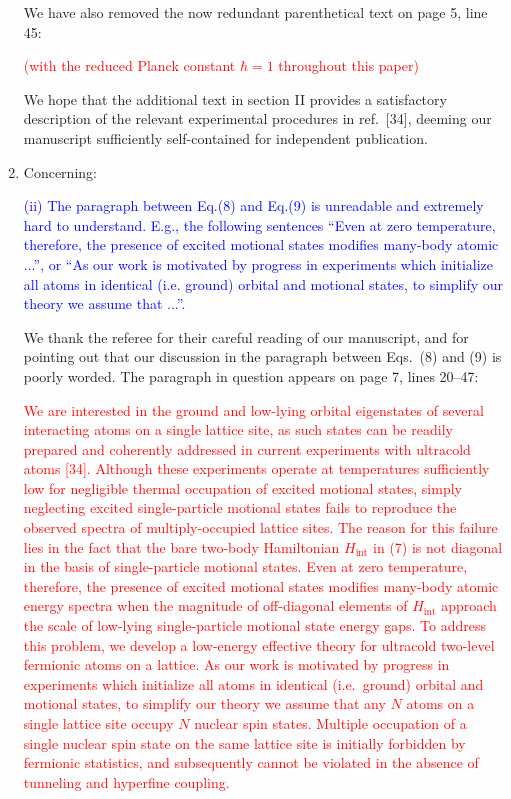 \documentclass[preprint]{revtex4-1}
\renewcommand{\t}{\text} %
\newcommand{\1}{\mathds{1}}
\newcommand{\blue}[1]{\textcolor{blue}{#1}}
\newcommand{\red}[1]{\textcolor{red}{#1}}
\begin{document}
\begin{enumerate}
  We have also removed the now redundant parenthetical text on page 5,
  line 45:

  \red{(with the reduced Planck constant $\hbar=1$ throughout this
    paper)}

  We hope that the additional text in section II provides a
  satisfactory description of the relevant experimental procedures in
  ref.~[34], deeming our manuscript sufficiently self-contained for
  independent publication.


\item Concerning:

  \blue{(ii) The paragraph between Eq.(8) and Eq.(9) is unreadable and
    extremely hard to understand. E.g., the following sentences ``Even
    at zero temperature, therefore, the presence of excited motional
    states modifies many-body atomic ...'', or ``As our work is
    motivated by progress in experiments which initialize all atoms in
    identical (i.e. ground) orbital and motional states, to simplify
    our theory we assume that ...''.}

  \label{pt:confusion}

  We thank the referee for their careful reading of our manuscript,
  and for pointing out that our discussion in the paragraph between
  Eqs.~(8) and (9) is poorly worded.  The paragraph in question
  appears on page 7, lines 20--47:

  \red{We are interested in the ground and low-lying orbital
    eigenstates of several interacting atoms on a single lattice site,
    as such states can be readily prepared and coherently addressed in
    current experiments with ultracold atoms [34].  Although these
    experiments operate at temperatures sufficiently low for
    negligible thermal occupation of excited motional states, simply
    neglecting excited single-particle motional states fails to
    reproduce the observed spectra of multiply-occupied lattice sites.
    The reason for this failure lies in the fact that the bare
    two-body Hamiltonian $H_{\t{int}}$ in (7) is not diagonal in the
    basis of single-particle motional states.  Even at zero
    temperature, therefore, the presence of excited motional states
    modifies many-body atomic energy spectra when the magnitude of
    off-diagonal elements of $H_{\t{int}}$ approach the scale of
    low-lying single-particle motional state energy gaps.  To address
    this problem, we develop a low-energy effective theory for
    ultracold two-level fermionic atoms on a lattice.  As our work is
    motivated by progress in experiments which initialize all atoms in
    identical (i.e.~ground) orbital and motional states, to simplify
    our theory we assume that any $N$ atoms on a single lattice site
    occupy $N$ nuclear spin states.  Multiple occupation of a single
    nuclear spin state on the same lattice site is initially forbidden
    by fermionic statistics, and subsequently cannot be violated in
    the absence of tunneling and hyperfine coupling.}


\end{enumerate}
\end{document}
